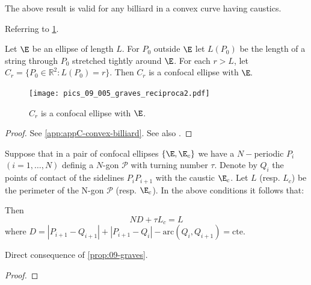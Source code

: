   The  above result is valid for any billiard in a convex curve having caustics. 
 
Referring to \cref{fig:09-reciproca-graves}.
      
\begin{proposition}
   Let $\E$ be an ellipse of length $L$.
   For $P_0$  outside $\E$ let $L(P_0)$   be the length of a string through $P_0$ stretched tightly around $\E$. For each $r>L$, let $C_r=\{P_0\in\mathbb{R}^2: L(P_0)=r\}.$  Then $C_r$ is a confocal ellipse with $\E.$ 
\label{prop:09-caustic}
\end{proposition} 
      
\begin{figure}
\begin{center}
\texttt{[image: pics\_09\_005\_graves\_reciproca2.pdf]}
\caption{$C_r$ is a confocal  ellipse with $\E$.}
\end{center}
\label{fig:09-reciproca-graves}
\end{figure}

\begin{proof} See \cref{app:appC-convex-billiard}. 
See also \cite[page 14]{akopyan2007-conics}.
\end{proof}

   Suppose that in a pair of confocal ellipses $\{\E,\E_c \}$ we have a $N-$periodic $P_i$ $(i=1,\ldots, N)$ definig a $N$-gon $\mathcal{P}$ with turning number $\tau$. Denote by $Q_i$ the points of contact of the sidelines $P_iP_{i+1}$ with the caustic $\E_c$. Let $L$ (resp. $L_c$) be the perimeter of the N-gon $\mathcal{P}$ (resp. $\E_c$). In the above conditions it follows that:
   
\begin{proposition}
   Then \[N D +\tau L_c= L\]
   where $D=|P_{i+1}-Q_{i+1}|+|P_{i+1}-Q_i|-\text{arc}(Q_i,Q_{i+1})=\text{cte}$.
  \label{prop:09-relacao-caustica} 
\end{proposition}
Direct consequence of \cref{prop:09-graves}.
\begin{proof}

\end{proof}

